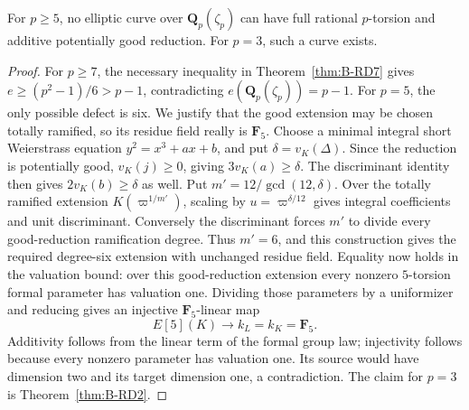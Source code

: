 \begin{corollary}\label{cor:B-RD11}
For $p\geq5$, no elliptic curve over $\mathbf Q_p(\zeta_p)$ can have
full rational $p$-torsion and additive potentially good reduction.
For $p=3$, such a curve exists.
\end{corollary}
\begin{proof}
For $p\geq7$, the necessary inequality in
Theorem~\ref{thm:B-RD7} gives
$e\geq(p^2-1)/6>p-1$, contradicting $e(\mathbf Q_p(\zeta_p))=p-1$.
For $p=5$, the only possible defect is six. We justify that the good
extension may be chosen totally ramified, so its residue field really
is $\mathbf F_5$. Choose a minimal integral short Weierstrass equation
$y^2=x^3+ax+b$, and put $\delta=v_K(\Delta)$. Since the reduction is
potentially good, $v_K(j)\geq0$, giving $3v_K(a)\geq\delta$.
The discriminant identity then gives $2v_K(b)\geq\delta$ as well.
Put $m'=12/\gcd(12,\delta)$. Over the totally ramified extension
$K(\varpi^{1/m'})$, scaling by $u=\varpi^{\delta/12}$ gives integral
coefficients and unit discriminant. Conversely the discriminant
forces $m'$ to divide every good-reduction ramification degree.
Thus $m'=6$, and this construction gives the required degree-six
extension with unchanged residue field. Equality now holds in the
valuation bound: over this good-reduction extension every nonzero
$5$-torsion formal parameter has valuation one. Dividing those
parameters by a uniformizer and reducing gives an injective
$\mathbf F_5$-linear map
\[
 E[5](K)\longrightarrow k_L=k_K=\mathbf F_5.
\]
Additivity follows from the linear term of the formal group law;
injectivity follows because every nonzero parameter has valuation
one. Its source would have dimension two and its target dimension
one, a contradiction. The claim for $p=3$ is
Theorem~\ref{thm:B-RD2}.
\end{proof}
